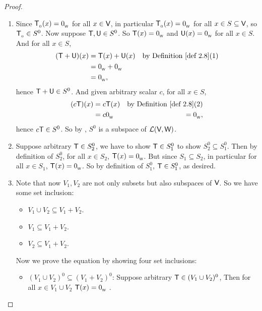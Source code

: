 \begin{proof} \ 
\begin{enumerate}
\item Since \(\textsf{T}_{_0}(x) = 0_{_{\textsf{W}}}\) for all \(x \in \textsf{V}\), in particular \(\textsf{T}_{_0}(x) = 0_{_{\textsf{W}}}\) for all \(x \in S \subseteq \textsf{V}\), so \(\textsf{T}_{_0} \in S^0\).
    Now suppose \(\textsf{T}, \textsf{U} \in S^0\).
    So \(\textsf{T}(x) = 0_{_{\textsf{W}}}\) and \(\textsf{U}(x) = 0_{_{\textsf{W}}}\) for all \(x \in S\).
    And for all \(x \in S\),
    \begin{align*}
        (\T + \U)(x) & = \T(x) + \U(x) & \text{by \DEF{2.8}(1)} \\
                     & = \OW + \OW \\
                     & = \OW,
    \end{align*}
    hence \(\textsf{T} + \textsf{U} \in S^0\).
    And given arbitrary scalar \(c\), for all \(x \in S\),
    \begin{align*}
        (c\T)(x) & = c\T(x) & \text{by \DEF{2.8}(2)} \\
                     & = c\OW
                     & = \OW,
    \end{align*}
    hence \(c\textsf{T}\in S^0\).
    So by , \(S^0\) is a subspace of \(\mathcal{L}(\textsf{V}, \textsf{W})\).

\item Suppose arbitrary \(\textsf{T} \in S^0_2\), we have to show \(\textsf{T} \in S^0_1\) to show \(S^0_2 \subseteq S^0_1\).
Then by definition of \(S^0_2\), for all \(x \in S_2\), \(\textsf{T}(x) = 0_{_{\textsf{W}}}\).
But since \(S_1 \subseteq S_2\), in particular for all \(x \in S_1\), \(\textsf{T}(x) = 0_{_{\textsf{W}}}\).
So by definition of \(S^0_1\), \(\textsf{T} \in S^0_1\), as desired.

\item Note that now \(V_1, V_2\) are not only subsets but also subspaces of \(\textsf{V}\).
So we have some set inclusion:
\begin{itemize}
    \item \(V_1 \cup V_2 \subseteq V_1 + V_2\).
    \item \(V_1 \subseteq V_1 + V_2\).
    \item \(V_2 \subseteq V_1 + V_2\).
\end{itemize}

Now we prove the equation by showing four set inclusions:
\begin{itemize}
    \item \((V_1 \cup V_2)^0 \subseteq (V_1 + V_2)^0\):
        Suppose arbitrary \(\textsf{T} \in (V_1 \cup V_2)^0\),
        Then for all \(x \in V_1 \cup V_2\) \(\textsf{T}(x) = 0_{_{\textsf{W}}}\) .
        

\end{itemize}
\end{enumerate}
\end{proof}

